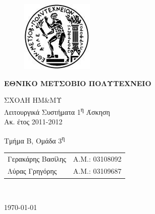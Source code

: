 \begin{titlepage}
\begin{center}
\begin{figure}[t] 
     \includegraphics[scale=0.7]{title/ntua_logo}
\end{figure}
\begin{LARGE}\textbf{ΕΘΝΙΚΟ ΜΕΤΣΟΒΙΟ ΠΟΛΥΤΕΧΝΕΙΟ\\}\end{LARGE}
\vspace{2cm}
\begin{Large}
ΣΧΟΛΗ ΗΜ\&ΜΥ\\
Λειτουργικά Συστήματα
1\textsuperscript{η} Άσκηση\\
Ακ. έτος 2011-2012\\
\end{Large}
\vspace{5cm}
\Large Τμήμα Β, Ομάδα 3\textsuperscript{η}\\
\vspace{1cm}
\begin{tabular}{l r}
\Large{Γερακάρης Βασίλης}&
\large{Α.Μ.: 03108092}\\
\Large{Λύρας Γρηγόρης}&
\large{Α.Μ.: 03109687}\\
\end{tabular}\\
\vspace{5cm}

\vfill
\large\today\\
\end{center}
\end{titlepage}

